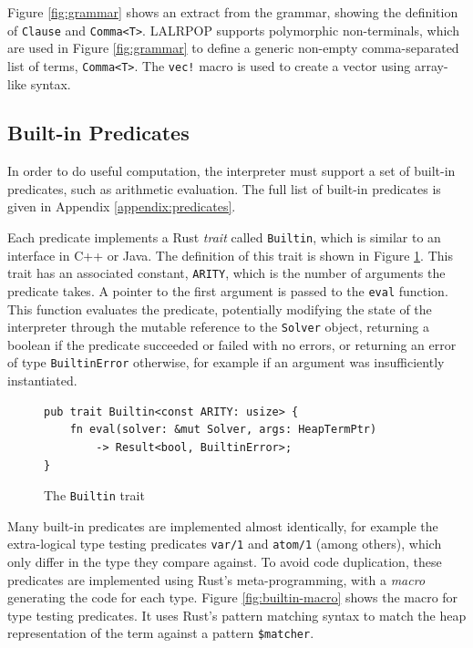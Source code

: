 Figure \ref{fig:grammar} shows an extract from the grammar, showing the definition of \texttt{Clause} and \texttt{Comma<T>}. LALRPOP supports polymorphic non-terminals, which are used in Figure \ref{fig:grammar} to define a generic non-empty comma-separated list of terms, \texttt{Comma<T>}. The \texttt{vec!} macro is used to create a vector using array-like syntax.

\subsection{Built-in Predicates}

\label{sec:builtins}

In order to do useful computation, the interpreter must support a set of built-in predicates, such as arithmetic evaluation. The full list of built-in predicates is given in Appendix \ref{appendix:predicates}.

Each predicate implements a Rust \emph{trait} called \texttt{Builtin}, which is similar to an interface in C++ or Java. The definition of this trait is shown in Figure \ref{fig:builtin-trait}. This trait has an associated constant, \texttt{ARITY}, which is the number of arguments the predicate takes. A pointer to the first argument is passed to the \texttt{eval} function. This function evaluates the predicate, potentially modifying the state of the interpreter through the mutable reference to the \texttt{Solver} object, returning a boolean if the predicate succeeded or failed with no errors, or returning an error of type \texttt{BuiltinError} otherwise, for example if an argument was insufficiently instantiated.

\begin{figure}[H]
\centering
\begin{verbatim}
pub trait Builtin<const ARITY: usize> {
    fn eval(solver: &mut Solver, args: HeapTermPtr)
        -> Result<bool, BuiltinError>;
}
\end{verbatim}
\caption{The \texttt{Builtin} trait}
\label{fig:builtin-trait}
\end{figure}

Many built-in predicates are implemented almost identically, for example the extra-logical type testing predicates \texttt{var/1} and \texttt{atom/1} (among others), which only differ in the type they compare against. To avoid code duplication, these predicates are implemented using Rust's meta-programming, with a \emph{macro} generating the code for each type. Figure \ref{fig:builtin-macro} shows the macro for type testing predicates. It uses Rust's pattern matching syntax to match the heap representation of the term against a pattern \texttt{\$matcher}.

